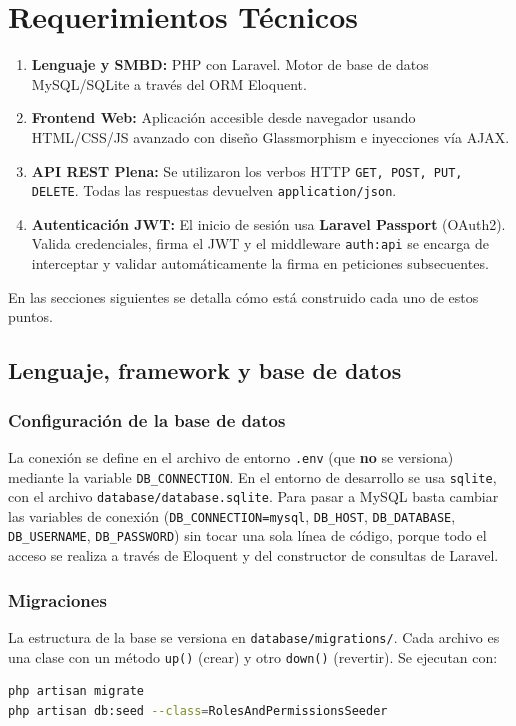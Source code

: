 \section{Requerimientos Técnicos}
\begin{enumerate}
    \item \textbf{Lenguaje y SMBD:} PHP con Laravel. Motor de base de datos MySQL/SQLite a través del ORM Eloquent.
    \item \textbf{Frontend Web:} Aplicación accesible desde navegador usando HTML/CSS/JS avanzado con diseño Glassmorphism e inyecciones vía AJAX.
    \item \textbf{API REST Plena:} Se utilizaron los verbos HTTP \texttt{GET, POST, PUT, DELETE}. Todas las respuestas devuelven \texttt{application/json}.
    \item \textbf{Autenticación JWT:}
    El inicio de sesión usa \textbf{Laravel Passport} (OAuth2). Valida credenciales, firma el JWT y el middleware \texttt{auth:api} se encarga de interceptar y validar automáticamente la firma en peticiones subsecuentes.
\end{enumerate}
En las secciones siguientes se detalla cómo está construido cada uno de estos puntos.

\subsection{Lenguaje, framework y base de datos}

\subsubsection{Configuración de la base de datos}
La conexión se define en el archivo de entorno \texttt{.env} (que \textbf{no} se versiona) mediante la variable \texttt{DB\_CONNECTION}. En el entorno de desarrollo se usa \texttt{sqlite}, con el archivo \texttt{database/database.sqlite}. Para pasar a MySQL basta cambiar las variables de conexión (\texttt{DB\_CONNECTION=mysql}, \texttt{DB\_HOST}, \texttt{DB\_DATABASE}, \texttt{DB\_USERNAME}, \texttt{DB\_PASSWORD}) sin tocar una sola línea de código, porque todo el acceso se realiza a través de Eloquent y del constructor de consultas de Laravel.

\subsubsection{Migraciones}
La estructura de la base se versiona en \texttt{database/migrations/}. Cada archivo es una clase con un método \texttt{up()} (crear) y otro \texttt{down()} (revertir). Se ejecutan con:
\begin{lstlisting}[language=bash, caption={Crear tablas y cargar datos iniciales}]
php artisan migrate
php artisan db:seed --class=RolesAndPermissionsSeeder
\end{lstlisting}

